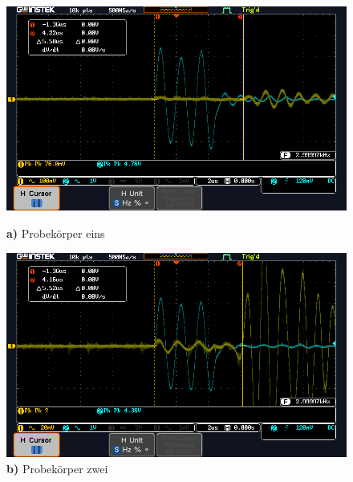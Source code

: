 \begin{figure}
    \begin{minipage}[b]{.50\linewidth} %
       \includegraphics[width=\linewidth]{image/1_Quer.PNG}
       \caption*{\textbf{a)} Probekörper eins}
    \end{minipage}
    \hspace{.01\linewidth}%
    \begin{minipage}[b]{.5\linewidth} %
       \includegraphics[width=\linewidth]{image/2_quer.PNG}
       \caption*{\textbf{b)} Probekörper zwei}
    \end{minipage}


\end{figure}
